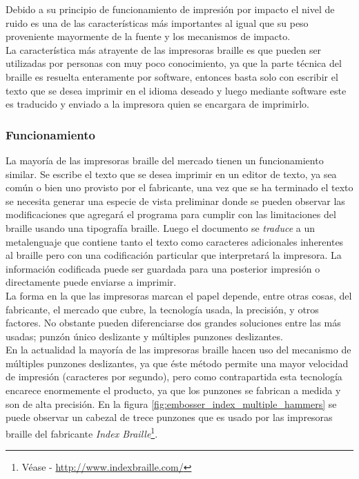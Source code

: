 Debido a su principio de funcionamiento de impresi\'on por impacto el nivel de
ruido es una de las caracter\'isticas m\'as importantes al igual que su peso
proveniente mayormente de la fuente y los mecanismos de impacto.\\

La caracter\'istica m\'as atrayente de las impresoras braille es que pueden ser
utilizadas por personas con muy poco conocimiento, ya que la parte t\'ecnica
del braille es resuelta enteramente por software, entonces basta solo con
escribir el texto que se desea imprimir en el idioma deseado y luego mediante
software este es traducido y enviado a la impresora quien se encargara de
imprimirlo.

\subsubsection{Funcionamiento}
%
La mayor\'ia de las impresoras braille del mercado tienen un funcionamiento
similar. Se escribe el texto que se desea imprimir en un editor de texto, ya
sea com\'un o bien uno provisto por el fabricante, una vez que se ha terminado
el texto se necesita generar una especie de vista preliminar donde se pueden
observar las modificaciones que agregar\'a el programa para cumplir con las
limitaciones del braille usando una tipograf\'ia braille. Luego el documento se
\emph{traduce} a un metalenguaje que contiene tanto el texto como caracteres
adicionales inherentes al braille pero con una codificaci\'on particular que
interpretar\'a la impresora. La informaci\'on codificada puede ser guardada
para una posterior impresi\'on o directamente puede enviarse a imprimir.\\

La forma en la que las impresoras marcan el papel depende, entre otras cosas,
del fabricante, el mercado que cubre, la tecnolog\'ia usada, la precisi\'on, y
otros factores.  
No obstante pueden diferenciarse dos grandes soluciones entre las m\'as
usadas; punz\'on \'unico deslizante y m\'ultiples punzones deslizantes.\\

En la actualidad la mayor\'ia de las impresoras braille hacen uso del mecanismo
de m\'ultiples punzones deslizantes, ya que \'este m\'etodo permite una mayor
velocidad de impresi\'on (caracteres por segundo), pero como contrapartida esta
tecnolog\'ia encarece enormemente el producto, ya que los punzones se fabrican
a
medida y son de alta precisi\'on. En la figura
\ref{fig:embosser_index_multiple_hammers} se puede observar un cabezal de trece
punzones que es usado por las impresoras braille del fabricante \emph{Index
Braille}\footnote{V\'ease - \url{http://www.indexbraille.com/}}.

